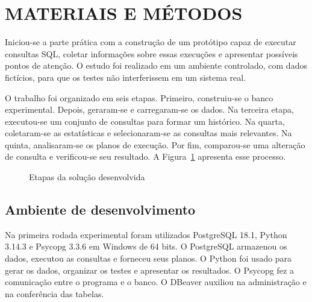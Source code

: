 \section{MATERIAIS E MÉTODOS}

Iniciou-se a parte prática com a construção de um protótipo capaz de executar consultas SQL, coletar informações sobre essas execuções e apresentar possíveis pontos de atenção. O estudo foi realizado em um ambiente controlado, com dados fictícios, para que os testes não interferissem em um sistema real.

O trabalho foi organizado em seis etapas. Primeiro, construiu-se o banco experimental. Depois, geraram-se e carregaram-se os dados. Na terceira etapa, executou-se um conjunto de consultas para formar um histórico. Na quarta, coletaram-se as estatísticas e selecionaram-se as consultas mais relevantes. Na quinta, analisaram-se os planos de execução. Por fim, comparou-se uma alteração de consulta e verificou-se seu resultado. A Figura~\ref{fig:fluxo-simples} apresenta esse processo.

\begin{figure}[H]
\centering
\caption{Etapas da solução desenvolvida}
\label{fig:fluxo-simples}
\fonteautor
\end{figure}

\subsection{Ambiente de desenvolvimento}

Na primeira rodada experimental foram utilizados PostgreSQL 18.1, Python 3.14.3 e Psycopg 3.3.6 em Windows de 64 bits. O PostgreSQL armazenou os dados, executou as consultas e forneceu seus planos. O Python foi usado para gerar os dados, organizar os testes e apresentar os resultados. O Psycopg fez a comunicação entre o programa e o banco. O DBeaver auxiliou na administração e na conferência das tabelas.

